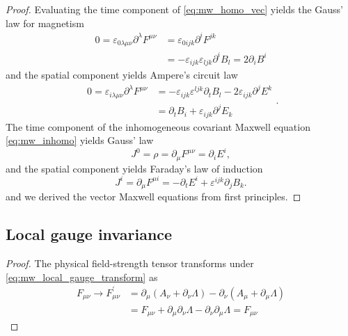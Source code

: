 \begin{proof}
	Evaluating the time component of \cref{eq:mw_homo_vec} yields the Gauss' law for magnetism
	\begin{equation*}
		\begin{split}
			0
			=
			\varepsilon_{0\lambda\mu\nu}\partial^\lambda F^{\mu\nu}
			&=
			\varepsilon_{0ijk}\partial^iF^{jk}
			\\
			&=
			-
			\varepsilon_{ijk}\varepsilon_{ljk}
			\partial^i B_l
			=
			2\partial_iB^i
		\end{split}
		\label{eq:mw_gauss_law_mag}
	\end{equation*}
	and the spatial component yields Ampere's circuit law
	\begin{equation*}
		\begin{split}
			0
			=
			\varepsilon_{i\lambda\mu\nu}
			\partial^\lambda
			F^{\mu\nu}
			&=
			-
			\varepsilon_{ijk}
			\varepsilon^{ljk}
			\partial_t B_l
			-
			2\varepsilon_{ijk}
			\partial^jE^k
			\\
			&=
			\partial_tB_i
			+
			\varepsilon_{ijk}
			\partial^jE_k
		\end{split}
		\label{eq:mw_ampere_law}.
	\end{equation*}
	The time component of the inhomogeneous covariant Maxwell equation \cref{eq:mw_inhomo} yields Gauss' law
	\begin{equation*}
		J^0
		=
		\rho
		=
		\partial_\mu F^{\mu\nu}
		=
		\partial_i E^i
		\label{eq:mw_gauss_law},
	\end{equation*}
	and the spatial component yields Faraday's law of induction
	\begin{equation*}
		J^i
		=
		\partial_\mu F^{\mu i}
		=
		-\partial_t E^i
		+\varepsilon^{ijk}\partial_j B_k
		\label{eq:mw_faraday_law}.
	\end{equation*}
	and we derived the vector Maxwell equations from first principles.
\end{proof}

\subsection{Local gauge invariance}

\mwlogalgaugeinvariance
\begin{proof}
	The physical field-strength tensor transforms under \cref{eq:mw_local_gauge_transform} as
	\begin{equation*}
		\begin{split}
			F_{\mu\nu}
			\to
			F_{\mu\nu}^\prime
			&=
			\partial_\mu\left(A_\nu+\partial_\nu\Lambda\right)
			-
			\partial_\nu\left(A_\mu+\partial_\mu\Lambda\right)
			\\
			&=
			F_{\mu\nu}
			+
			\partial_\mu\partial_\nu\Lambda
			-
			\partial_\nu\partial_\mu\Lambda
			=
			F_{\mu\nu}
		\end{split}
	\end{equation*}	
\end{proof}

